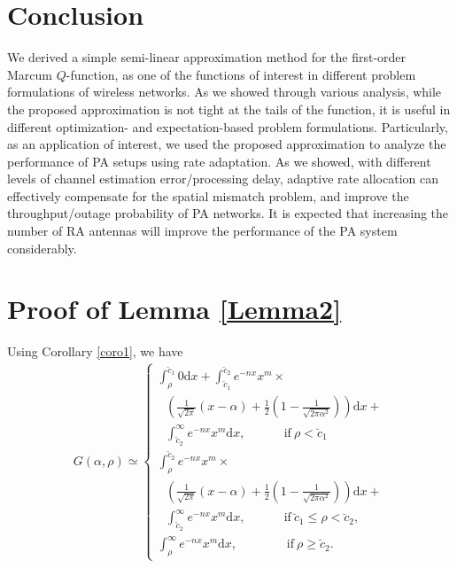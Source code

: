 \section{Conclusion}
We derived a simple semi-linear approximation method for the first-order Marcum $Q$-function, as one of the functions of interest in different problem formulations of wireless networks. As we showed through various analysis, while the proposed approximation is not tight at the tails of the function, it is useful in different optimization- and expectation-based problem formulations. Particularly, as an application of interest, we used the proposed approximation to analyze the performance of PA setups using  rate adaptation. As we showed, with different levels of channel estimation error/processing delay, adaptive rate allocation can effectively compensate for the spatial mismatch problem, and improve the throughput/outage probability of PA networks.  It is expected that increasing the number of RA antennas will improve the performance of the PA system considerably. 












\appendices
\section{Proof of Lemma \ref{Lemma2}}
  \label{proof_Lemma2}
Using Corollary \ref{coro1},  we have
\begin{align}
G(\alpha,\rho)\simeq
\begin{cases}
\int_\rho^{\breve{c}_1}0\text{d}x + \int_{\breve{c}_1}^{\breve{c}_2}e^{-nx}x^{m}\times\nonumber\\
~~~\left(\frac{1}{\sqrt{2\pi}}(x-\alpha) + \frac{1}{2}\left(1-\frac{1}{\sqrt{2\pi\alpha^2}}\right)\right)\text{d}x +\nonumber\\
~~~\int_{\breve{c}_2}^{\infty}e^{-nx}x^{m}\text{d}x, ~~~~~~~~~~~~~~\mathrm{if}~  \rho < \breve{c}_1  \\ 
 \int_{\rho}^{\breve{c}_2}e^{-nx}x^{m}\times\nonumber\\
~~~\left(\frac{1}{\sqrt{2\pi}}(x-\alpha) + \frac{1}{2}\left(1-\frac{1}{\sqrt{2\pi\alpha^2}}\right)\right)\text{d}x +\nonumber\\
~~~\int_{\breve{c}_2}^{\infty}e^{-nx}x^{m}\text{d}x, ~~~~~~~~~~~~~~\mathrm{if}~  \breve{c}_1\leq\rho<\breve{c}_2,\nonumber\\
\int_\rho^{\infty} e^{-nx}x^{m}\text{d}x, ~~~~~~~~~~~~~~~~~~\mathrm{if}~  \rho\geq\breve{c}_2.
\end{cases}
\end{align}


